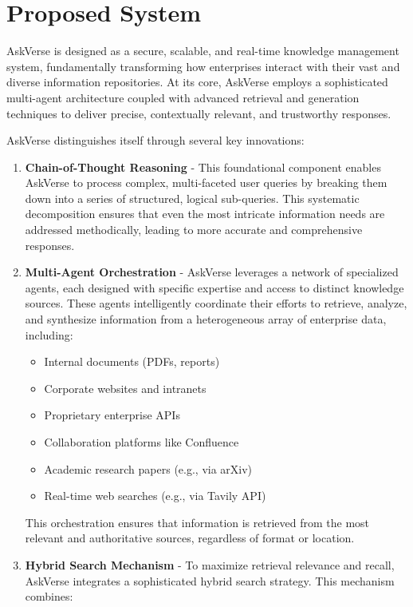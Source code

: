 \documentclass[default]{sn-jnl}%
\begin{document}
\section*{Proposed System}
AskVerse is designed as a secure, scalable, and real-time knowledge management system, fundamentally transforming how enterprises interact with their vast and diverse information repositories. At its core, AskVerse employs a sophisticated multi-agent architecture coupled with advanced retrieval and generation techniques to deliver precise, contextually relevant, and trustworthy responses.

AskVerse distinguishes itself through several key innovations:
\begin{enumerate}
    \item \textbf{Chain-of-Thought Reasoning} - This foundational component enables AskVerse to process complex, multi-faceted user queries by breaking them down into a series of structured, logical sub-queries. This systematic decomposition ensures that even the most intricate information needs are addressed methodically, leading to more accurate and comprehensive responses.
    \item \textbf{Multi-Agent Orchestration} - AskVerse leverages a network of specialized agents, each designed with specific expertise and access to distinct knowledge sources. These agents intelligently coordinate their efforts to retrieve, analyze, and synthesize information from a heterogeneous array of enterprise data, including:
    \begin{itemize}
        \item Internal documents (PDFs, reports)
        \item Corporate websites and intranets
        \item Proprietary enterprise APIs
        \item Collaboration platforms like Confluence
        \item Academic research papers (e.g., via arXiv)
        \item Real-time web searches (e.g., via Tavily API)
    \end{itemize}
    This orchestration ensures that information is retrieved from the most relevant and authoritative sources, regardless of format or location.
    \item \textbf{Hybrid Search Mechanism} - To maximize retrieval relevance and recall, AskVerse integrates a sophisticated hybrid search strategy. This mechanism combines:
    \begin{itemize}

\end{itemize}
\end{enumerate}
\end{document}
